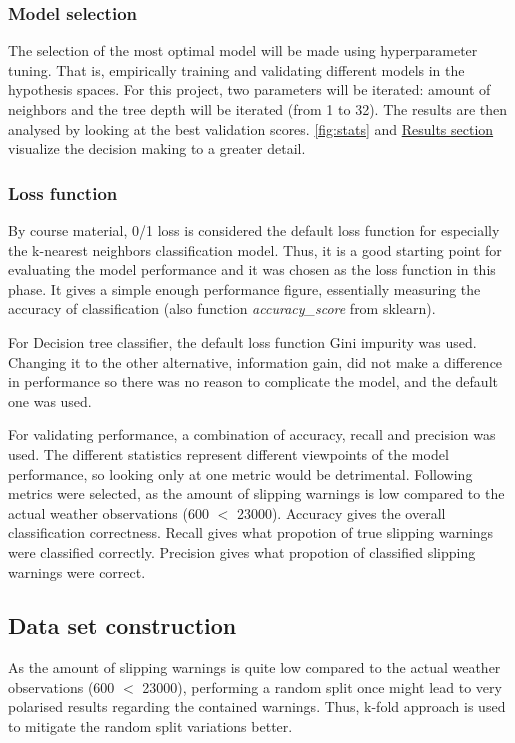 \documentclass[12pt, a4paper]{article}
\begin{document}
    \subsubsection{Model selection}
    The selection of the most optimal model will be made using hyperparameter tuning. That is, empirically training and validating different models
    in the hypothesis spaces. For this project, two parameters will be iterated: amount of neighbors and the tree depth will 
    be iterated (from 1 to 32). The results are then analysed by looking at the best validation scores. \autoref{fig:stats} and \hyperlink{section.0.4}{Results section}
    visualize the decision making to a greater detail.

    \subsubsection{Loss function}
    By course material, 0/1 loss is considered the default loss function for especially the k-nearest neighbors classification model. Thus, it is a 
    good starting point for evaluating the model performance and it was chosen as the loss function in this phase. It gives a 
    simple enough performance figure, essentially measuring the accuracy of classification (also function \textit{accuracy\_score} from sklearn).
    
    For Decision tree classifier, the default loss function Gini impurity was used. Changing it to the other alternative,
    information gain, did not make a difference in performance so there was no reason to complicate the model, and the default one was used.

    For validating performance, a combination of accuracy, recall and precision was used. The different statistics
    represent different viewpoints of the model performance, so looking only at one metric would be detrimental. Following
    metrics were selected, as the amount of slipping warnings is low compared to the actual weather observations (600 $<$ 23000). Accuracy gives
    the overall classification correctness. Recall gives what propotion of true slipping warnings were classified correctly.
    Precision gives what propotion of classified slipping warnings were correct. 
    \subsection{Data set construction}
    As the amount of slipping warnings is quite low compared to the actual weather observations (600 $<$ 23000), performing a random split once might lead to 
    very polarised results regarding the contained warnings. Thus, k-fold approach is used to mitigate the random split variations better.
\end{document}
